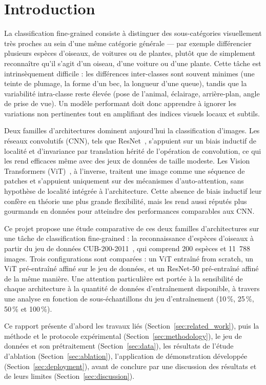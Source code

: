 \section{Introduction}
\label{sec:introduction}

La classification fine-grained consiste à distinguer des sous-catégories
visuellement très proches au sein d'une même catégorie générale — par
exemple différencier plusieurs espèces d'oiseaux, de voitures ou de
plantes, plutôt que de simplement reconnaître qu'il s'agit d'un oiseau,
d'une voiture ou d'une plante. Cette tâche est intrinsèquement difficile :
les différences inter-classes sont souvent minimes (une teinte de plumage,
la forme d'un bec, la longueur d'une queue), tandis que la variabilité
intra-classe reste élevée (pose de l'animal, éclairage, arrière-plan,
angle de prise de vue). Un modèle performant doit donc apprendre à ignorer
les variations non pertinentes tout en amplifiant des indices visuels
locaux et subtils.

Deux familles d'architectures dominent aujourd'hui la classification
d'images. Les réseaux convolutifs (CNN), tels que ResNet~\cite{he2016resnet},
s'appuient sur un biais inductif de localité et d'invariance par
translation hérité de l'opération de convolution, ce qui les rend
efficaces même avec des jeux de données de taille modeste. Les Vision
Transformers (ViT)~\cite{dosovitskiy2020vit}, à l'inverse, traitent une
image comme une séquence de patches et s'appuient uniquement sur des
mécanismes d'auto-attention, sans hypothèse de localité intégrée à
l'architecture. Cette absence de biais inductif leur confère en théorie
une plus grande flexibilité, mais les rend aussi réputés plus gourmands en
données pour atteindre des performances comparables aux CNN.

Ce projet propose une étude comparative de ces deux familles
d'architectures sur une tâche de classification fine-grained : la
reconnaissance d'espèces d'oiseaux à partir du jeu de données
CUB-200-2011~\cite{wah2011cub}, qui comprend 200 espèces et 11~788 images.
Trois configurations sont comparées : un ViT entraîné from scratch, un ViT
pré-entraîné affiné sur le jeu de données, et un ResNet-50 pré-entraîné
affiné de la même manière. Une attention particulière est portée à la
sensibilité de chaque architecture à la quantité de données
d'entraînement disponible, à travers une analyse en fonction de
sous-échantillons du jeu d'entraînement (10\,\%, 25\,\%, 50\,\% et
100\,\%).

Ce rapport présente d'abord les travaux liés (Section~\ref{sec:related_work}),
puis la méthode et le protocole expérimental (Section~\ref{sec:methodology}),
le jeu de données et son prétraitement (Section~\ref{sec:data}), les
résultats de l'étude d'ablation (Section~\ref{sec:ablation}), l'application
de démonstration développée (Section~\ref{sec:deployment}), avant de
conclure par une discussion des résultats et de leurs limites
(Section~\ref{sec:discussion}).